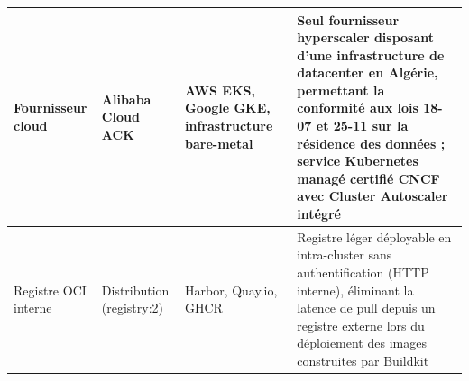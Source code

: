 \begin{longtable}{|p{2.8cm}|p{2.5cm}|p{2.5cm}|p{5.2cm}|}
\hline
Fournisseur cloud
  & Alibaba Cloud ACK
  & AWS EKS, Google GKE, infrastructure bare-metal
  & Seul fournisseur hyperscaler disposant d'une infrastructure de datacenter en Algérie, permettant la conformité aux lois 18-07 et 25-11 sur la résidence des données ; service Kubernetes managé certifié CNCF avec Cluster Autoscaler intégré \cite{ack-overview} \\
\hline
Registre OCI interne
  & Distribution (registry:2)
  & Harbor, Quay.io, GHCR
  & Registre léger déployable en intra-cluster sans authentification (HTTP interne), éliminant la latence de pull depuis un registre externe lors du déploiement des images construites par Buildkit \\
\hline

\end{longtable}
